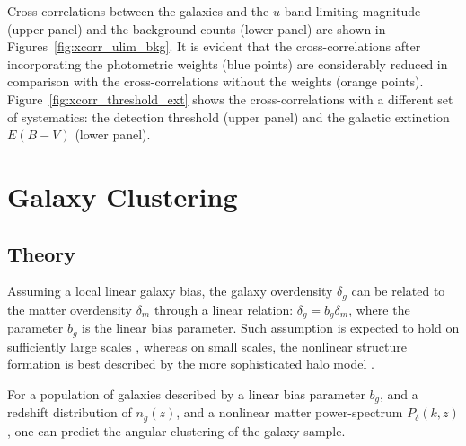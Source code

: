 \documentclass[fleqn,usenatbib,useAMS]{mnras}
\begin{document}
Cross-correlations between the galaxies and the $u$-band limiting magnitude (upper panel) and the background counts (lower panel) are shown in Figures~\ref{fig:xcorr_ulim_bkg}. It is evident that the cross-correlations after incorporating the photometric weights (blue points) are considerably reduced in comparison with the cross-correlations without the weights (orange points). Figure~\ref{fig:xcorr_threshold_ext} shows the cross-correlations with a different set of systematics: the detection threshold (upper panel) and the galactic extinction $E(B-V)$ (lower panel).


\section{Galaxy Clustering}\label{sec:clustering}

\subsection{Theory}

Assuming a local linear galaxy bias, the galaxy overdensity $\delta_g$ can be related to the matter overdensity $\delta_m$ through a linear relation: $\delta_g = b_g \delta_m$, where the parameter $b_g$ is the linear bias parameter. Such assumption is expected to hold on sufficiently large scales \citep[e.g.][]{dvornik2018}, whereas on small scales, the nonlinear structure formation is best described by the more sophisticated halo model \citep[e.g. ][]{hand2017,vakili_hahn}.

For a population of galaxies described by a linear bias parameter $b_g$, and a redshift distribution of $n_g(z)$, and a nonlinear matter power-spectrum $P_{\delta}(k,z)$, one can predict the angular clustering of the galaxy sample.
\end{document}
